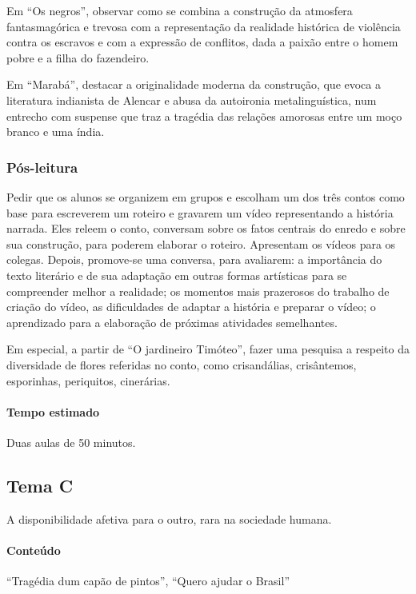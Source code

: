 \documentclass[11pt]{extarticle}
\begin{document}
Em ``Os negros'', observar como se combina a construção da atmosfera
fantasmagórica e trevosa com a representação da realidade histórica de
violência contra os escravos e com a expressão de conflitos, dada a
paixão entre o homem pobre e a filha do fazendeiro.

Em ``Marabá'', destacar a originalidade moderna da construção, que evoca
a literatura indianista de Alencar e abusa da autoironia
metalinguística, num entrecho com suspense que traz a tragédia das
relações amorosas entre um moço branco e uma índia.

\subsubsection{Pós-leitura}

Pedir que os alunos se organizem em grupos e escolham um dos três contos
como base para escreverem um roteiro e gravarem um vídeo representando a
história narrada. Eles releem o conto, conversam sobre os fatos centrais
do enredo e sobre sua construção, para poderem elaborar o roteiro.
Apresentam os vídeos para os colegas. Depois, promove-se uma conversa,
para avaliarem: a importância do texto literário e de sua adaptação em
outras formas artísticas para se compreender melhor a realidade; os
momentos mais prazerosos do trabalho de criação do vídeo, as
dificuldades de adaptar a história e preparar o vídeo; o aprendizado
para a elaboração de próximas atividades semelhantes.

Em especial, a partir de ``O jardineiro Timóteo'', fazer uma pesquisa a
respeito da diversidade de flores referidas no conto, como crisandálias,
crisântemos, esporinhas, periquitos, cinerárias.

\paragraph{Tempo estimado} Duas aulas de 50 minutos.

\subsection{Tema C}

A disponibilidade afetiva para o outro, rara na sociedade humana.

\paragraph{Conteúdo} ``Tragédia dum capão de pintos'', ``Quero ajudar o Brasil''
\end{document}
